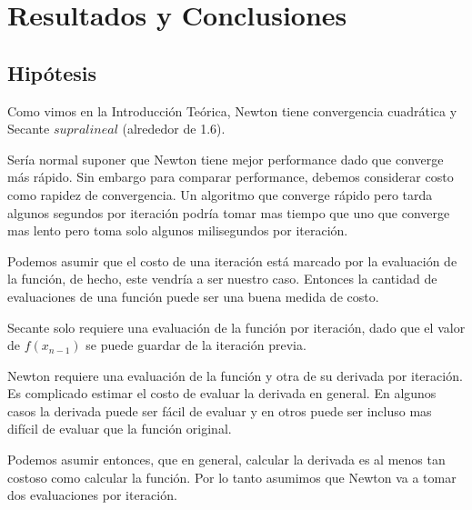 \section{Resultados y Conclusiones}


\subsection{Hipótesis}
Como vimos en la Introducción Teórica, Newton tiene convergencia cuadrática y
Secante $supralineal$ (alrededor de 1.6).

Sería normal suponer que Newton tiene mejor performance dado que converge más
rápido. Sin embargo para comparar performance, debemos considerar costo como
rapidez de convergencia. Un algoritmo que converge rápido pero tarda algunos
segundos por iteración podría tomar mas tiempo que uno que converge mas lento
pero toma solo algunos milisegundos por iteración.

Podemos asumir que el costo de una iteración está marcado por la evaluación de
la función, de hecho, este vendría a ser nuestro caso. Entonces la cantidad de
evaluaciones de una función puede ser una buena medida de costo.

Secante solo requiere una evaluación de la función por iteración, dado que el
valor de $f(x_{n - 1})$ se puede guardar de la iteración previa.

Newton requiere una evaluación de la función y otra de su derivada por
iteración. Es complicado estimar el costo de evaluar la derivada en general. En
algunos casos la derivada puede ser fácil de evaluar y en otros puede ser
incluso mas difícil de evaluar que la función original.

Podemos asumir entonces, que en general, calcular la derivada es al menos tan
costoso como calcular la función. Por lo tanto asumimos que Newton va a tomar
dos evaluaciones por iteración.

